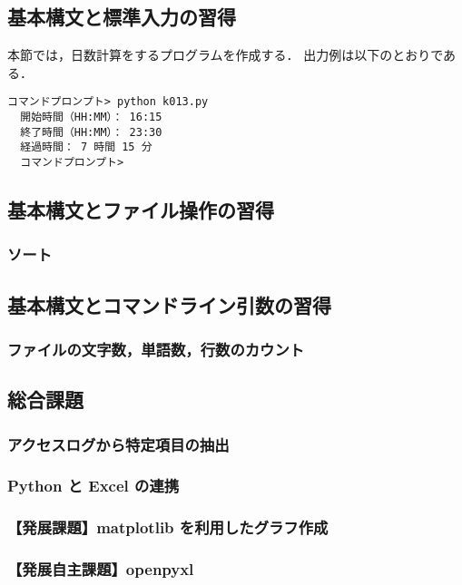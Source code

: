 \documentclass[uplatex,dvipdfmx,12pt]{jsarticle}
\begin{document}
\subsection{基本構文と標準入力の習得}
本節では，日数計算をするプログラムを作成する．
出力例は以下のとおりである．

\begin{lstlisting}[caption={日数計算プログラムの出力例},label=dayPro]
  コマンドプロンプト> python k013.py
  開始時間（HH:MM）： 16:15
  終了時間（HH:MM）： 23:30
  経過時間： 7 時間 15 分
  コマンドプロンプト>
\end{lstlisting}

\subsection{基本構文とファイル操作の習得}
\subsubsection{ソート}

\subsection{基本構文とコマンドライン引数の習得}
\subsubsection{ファイルの文字数，単語数，行数のカウント}

\subsection{総合課題}
\subsubsection{アクセスログから特定項目の抽出}

\subsubsection{Python と Excel の連携}

\subsubsection{【発展課題】matplotlib を利用したグラフ作成}

\subsubsection{【発展自主課題】openpyxl}
\end{document}
